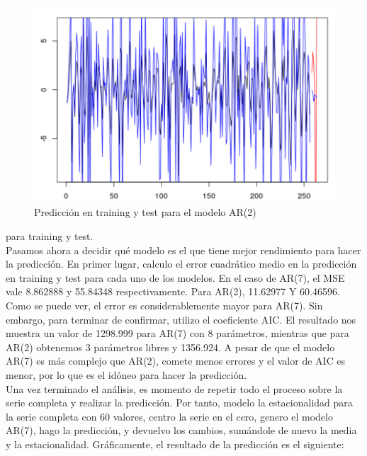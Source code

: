 \begin{figure}[H] %
	\centering
	\includegraphics[scale=0.25]{ar210-diario.png}  %
	\caption{Predicción en training y test para el modelo AR(2)} 
	\label{fig:ar210-d}
\end{figure}

para training y test.\\

Pasamos ahora a decidir qué modelo es el que tiene mejor rendimiento para hacer la predicción. En primer lugar, calculo el error cuadrático medio en la predicción en training y test para cada uno de los modelos. En el caso de AR(7), el MSE vale 8.862888 y 55.84348 respectivamente. Para AR(2), 11.62977 Y 60.46596. Como se puede ver, el error es considerablemente mayor para AR(7). Sin embargo, para terminar de confirmar, utilizo el coeficiente AIC. El resultado nos muestra un valor de 1298.999 para AR(7) con 8 parámetros, mientras que para AR(2) obtenemos 3 parámetros libres y 1356.924. A pesar de que el modelo AR(7) es más complejo que AR(2), comete menos errores y el valor de AIC es menor, por lo que es el idóneo para hacer la predicción. \\

Una vez terminado el análisis, es momento de repetir todo el proceso sobre la serie completa y realizar la predicción. Por tanto, modelo la estacionalidad para la serie completa con 60 valores, centro la serie en el cero, genero el modelo AR(7), hago la predicción, y devuelvo los cambios, sumándole de nuevo la media y la estacionalidad. Gráficamente, el resultado de la predicción es el siguiente:

